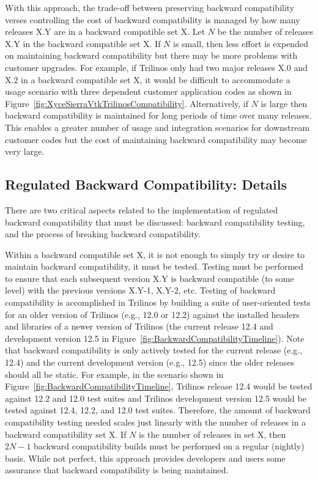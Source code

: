 \documentclass[11pt]{SANDreport}
\begin{document}
With this approach, the trade-off between preserving backward compatibility verses controlling the cost of backward compatibility is managed by how many releases X.Y are in a backward compatible set X. Let $N$ be the number of releases X.Y in the backward compatible set X.  If $N$ is small, then less effort is expended on maintaining backward compatibility but there may be more problems with customer upgrades.  For example, if Trilinos only had two major releases X.0 and X.2 in a backward compatible set X, it would be difficult to accommodate a usage scenario with three dependent customer application codes as shown in Figure~\ref{fig:XyceSierraVtkTrilinosCompatibility}. Alternatively, if $N$ is large then backward compatibility is maintained for long periods of time over many releases.  This enables a greater number of usage and integration scenarios for downstream customer codes but the cost of maintaining backward compatibility may become very large.


%
{}\subsection{Regulated Backward Compatibility: Details}
\label{sec:details_reg_back_compat}
%

There are two critical aspects related to the implementation of regulated backward compatibility that must be discussed: backward compatibility testing, and the process of breaking backward compatibility.

Within a backward compatible set X, it is not enough to simply try or desire to maintain backward compatibility, it must be tested.  Testing must be performed to ensure that each subsequent version X.Y is backward compatible (to some level) with the previous versions X.Y-1, X.Y-2, etc.  Testing of backward compatibility is accomplished in Trilinos by building a suite of user-oriented tests for an older version of Trilinos (e.g., 12.0 or 12.2) against the installed headers and libraries of a newer version of Trilinos (the current release 12.4 and development version 12.5 in Figure~\ref{fig:BackwardCompatibilityTimeline}).  Note that backward compatibility is only actively tested for the current release (e.g., 12.4) and the current development version (e.g., 12.5) since the older releases should all be static.  For example, in the scenario shown in Figure~\ref{fig:BackwardCompatibilityTimeline}, Trilinos release 12.4 would be tested against 12.2 and 12.0 test suites and Trilinos development version 12.5 would be tested against 12.4, 12.2, and 12.0 test suites.  Therefore, the amount of backward compatibility testing needed scales just linearly with the number of releases in a backward compatibility set X.  If $N$ is the number of releases in set X, then $2 N-1$ backward compatibility builds must be performed on a regular (nightly) basis.  While not perfect, this approach provides developers and users some assurance that backward compatibility is being maintained.
\end{document}
